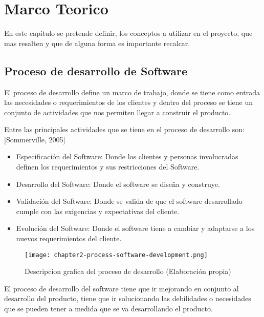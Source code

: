 \chapter{Marco Teorico}
\noindent En este capítulo se pretende definir, los conceptos a utilizar en el proyecto, que mas resalten y que de alguna forma es importante recalcar.


\section{Proceso de desarrollo de Software}
\noindent El proceso de desarrollo define un marco de trabajo, donde se tiene como entrada las necesidades o requerimientos de los clientes y dentro del proceso se tiene un conjunto de actividades que nos permiten llegar a construir el producto.

\noindent Entre las principales actividades que se tiene en el proceso de desarrollo son:[Sommerville, 2005]
\begin{itemize}
  \item Especificación del Software: Donde los clientes y personas involucradas definen los requerimientos y sus restricciones del  Software.
  \item Desarrollo del Software: Donde el software se diseña y construye.
  \item Validación del Software: Donde se valida de que el software desarrollado cumple con las exigencias y expectativas del cliente.
  \item Evolución del Software: Donde el software tiene a cambiar y adaptarse a los nuevos requerimientos del cliente.
\end{itemize}

\begin{figure}[ht]
  \centering
  \texttt{[image: chapter2-process-software-development.png]}
  \caption{Descripcion grafica del proceso de desarrollo (Elaboración propia)}  
\end{figure}

\noindent El proceso de desarrollo del software tiene que ir mejorando en conjunto al desarrollo del producto, tiene que ir solucionando las debilidades o necesidades que se pueden tener a medida que se va desarrollando el producto.
 
